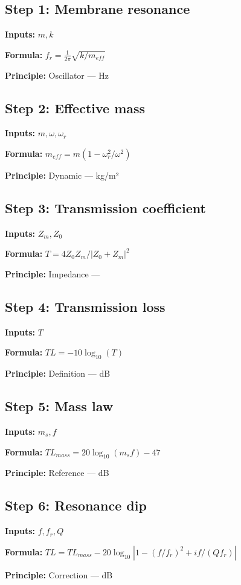 \documentclass[11pt,twocolumn]{article}
\begin{document}
\subsection*{Step 1: Membrane resonance}
\textbf{Inputs:} $m, k$

\textbf{Formula:} $f_r = \frac{1}{2\pi}\sqrt{k/m_{eff}}$

\textbf{Principle:} Oscillator --- Hz

\subsection*{Step 2: Effective mass}
\textbf{Inputs:} $m, \omega, \omega_r$

\textbf{Formula:} $m_{eff} = m(1 - \omega_r^2/\omega^2)$

\textbf{Principle:} Dynamic --- kg/m²

\subsection*{Step 3: Transmission coefficient}
\textbf{Inputs:} $Z_m, Z_0$

\textbf{Formula:} $T = 4Z_0 Z_m / |Z_0 + Z_m|^2$

\textbf{Principle:} Impedance --- 

\subsection*{Step 4: Transmission loss}
\textbf{Inputs:} $T$

\textbf{Formula:} $TL = -10\log_{10}(T)$

\textbf{Principle:} Definition --- dB

\subsection*{Step 5: Mass law}
\textbf{Inputs:} $m_s, f$

\textbf{Formula:} $TL_{mass} = 20\log_{10}(m_s f) - 47$

\textbf{Principle:} Reference --- dB

\subsection*{Step 6: Resonance dip}
\textbf{Inputs:} $f, f_r, Q$

\textbf{Formula:} $TL = TL_{mass} - 20\log_{10}|1-(f/f_r)^2 + if/(Qf_r)|$

\textbf{Principle:} Correction --- dB
\end{document}
